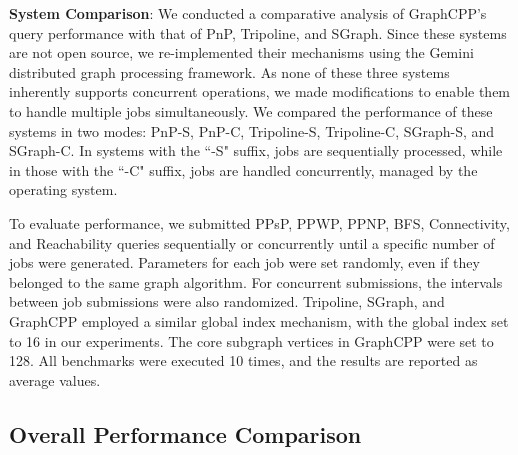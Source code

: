 \documentclass[lettersize,journal]{IEEEtran} %
\begin{document}
{\bf{System Comparison}}: We conducted a comparative analysis of GraphCPP's query performance with that of PnP, Tripoline, and SGraph\cite{sgraph}. Since these systems are not open source, we re-implemented their mechanisms using the Gemini distributed graph processing framework. As none of these three systems inherently supports concurrent operations, we made modifications to enable them to handle multiple jobs simultaneously. We compared the performance of these systems in two modes: PnP-S, PnP-C, Tripoline-S, Tripoline-C, SGraph-S, and SGraph-C. In systems with the ``-S" suffix, jobs are sequentially processed, while in those with the ``-C" suffix, jobs are handled concurrently, managed by the operating system.

To evaluate performance, we submitted PPsP, PPWP, PPNP, BFS, Connectivity, and Reachability queries sequentially or concurrently until a specific number of jobs were generated. Parameters for each job were set randomly, even if they belonged to the same graph algorithm. For concurrent submissions, the intervals between job submissions were also randomized. Tripoline, SGraph\cite{sgraph}, and GraphCPP employed a similar global index mechanism, with the global index set to 16 in our experiments. The core subgraph vertices in GraphCPP were set to 128. All benchmarks were executed 10 times, and the results are reported as average values.
    

\subsection{Overall Performance Comparison}
\end{document}
